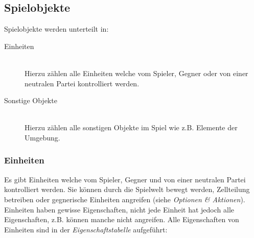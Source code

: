 \documentclass[11pt]{article}
\begin{document}
\subsection{Spielobjekte}

Spielobjekte werden unterteilt in:
\begin{description}
\item[Einheiten]\hfill \\
Hierzu z\"ahlen alle Einheiten welche vom Spieler, Gegner oder von einer neutralen Partei kontrolliert werden.
\item[Sonstige Objekte]\hfill \\
Hierzu z\"ahlen alle sonstigen Objekte im Spiel wie z.B. Elemente der Umgebung.
\end{description}

\subsubsection{Einheiten}
Es gibt Einheiten welche vom Spieler, Gegner und von einer neutralen Partei kontrolliert werden. Sie k\"onnen durch die Spielwelt bewegt werden, Zellteilung betreiben oder gegnerische Einheiten angreifen (siehe \textit{Optionen \& Aktionen}). Einheiten haben gewisse Eigenschaften, nicht jede Einheit hat jedoch alle Eigenschaften, z.B. k\"onnen manche nicht angreifen. Alle Eigenschaften von Einheiten sind in der \textit{Eigenschaftstabelle} aufgef\"uhrt:
\end{document}
